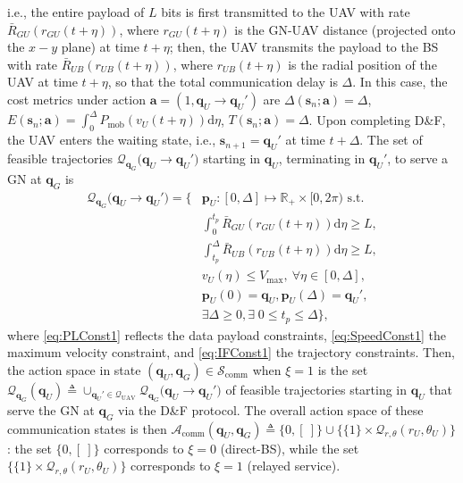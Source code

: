 \documentclass[10pt, twocolumn]{IEEEtran}
\theoremstyle{plain}
\theoremstyle{definition}
\theoremstyle{remark}
\begin{document}
i.e., the entire payload of $L$ bits is first transmitted to the UAV with rate $\bar R_{GU}(r_{GU}(t{+}\eta))$, where $r_{GU}(t{+}{\eta})$ is the GN-UAV distance (projected onto the $x{-}y$ plane) at time $t{+}\eta$; then, the UAV transmits the payload to the BS with rate $\bar{R}_{UB}(r_{UB}(t{+}\eta))$, where $r_{UB}(t{+}\eta)$ is the radial position of the UAV at time $t{+}\eta$, so that the total communication delay is $\Delta$.  In this case, the cost metrics under action $\mathbf{{a}}=(1,\mathbf{q}_{U}{\rightarrow}{\mathbf{q}}_{U}')$ are $\Delta(\mathbf{s}_{n};\mathbf{{a}}){=}\Delta$, $E(\mathbf{s}_{n};\mathbf{{a}}){=}\int_0^\Delta P_{\mathrm{mob}}\left(v_{U}(t{+}\eta)\right)\mathrm{d}\eta$, $T(\mathbf{s}_{n};\mathbf{{a}}){=}\Delta$. Upon completing D\&F, the UAV enters the {waiting} state, i.e., $\mathbf{s}_{n{+}1}{=}\mathbf{q}_{U}'$ at time $t{+}\Delta$. The set of feasible trajectories $\mathcal{Q}_{\mathbf q_G} \big({\mathbf q}_U\rightarrow{\mathbf q}_U'\big)$ starting in $\mathbf{q}_{U}$, terminating in $\mathbf{q}_{U}'$, to serve a GN at $\mathbf{q}_{G}$ is
\begin{align}
	\mathcal{Q}_{\mathbf q_G} \big({\mathbf q}_U\rightarrow{\mathbf q}_U'\big) = \Big\{ &\mathbf{p}_{U} : 
	[0,\Delta] \mapsto \mathbb{R}_{+} \times[0,2\pi)\text{ s.t.}\nonumber\\
	&\int_{0}^{t_{p}} \bar{R}_{GU}(r_{GU}(t+\eta)) \mathrm d \eta \geq L,\nonumber\\ &\int_{t_p}^{\Delta} \bar R_{UB}(r_{UB}(t+\eta)) \mathrm d \eta \geq L, \label{eq:PLConst1}\tag{C.1}\\
	&v_U (\eta) \leq V_{\mathrm{max}},\ \forall\eta\in[0,\Delta],\label{eq:SpeedConst1}\tag{C.2}\\
	&\mathbf{p}_{U}(0) ={\mathbf q}_U, 
	\mathbf{p}_{U}(\Delta) ={\mathbf q}_U',\label{eq:IFConst1}\tag{C.3}\\
	&\exists \Delta \geq 0, \exists\; 0 \leq t_p \leq \Delta 
	\Big\}\nonumber,
\end{align}
where \ref{eq:PLConst1} reflects the data payload constraints, \ref{eq:SpeedConst1} the maximum velocity constraint, and \ref{eq:IFConst1} the trajectory constraints. Then, the action space in state $(\mathbf{q}_{U},\mathbf{q}_{G}){\in}\mathcal{S}_{\mathrm{comm}}$ when $\xi{=}1$ is the set $\mathcal{Q}_{\mathbf{q}_{G}}(\mathbf{q}_{U}){\triangleq}\cup_{\mathbf{q}_{U}'{\in}\mathcal{Q}_{\mathrm{UAV}}}\mathcal{Q}_{\mathbf{q}_{G}}\big(\mathbf{q}_{U}{\rightarrow}\mathbf{q}_{U}'\big)$ of feasible trajectories starting in $\mathbf{q}_{U}$ that serve the GN at $\mathbf{q}_{G}$ via the D\&F protocol. The overall action space of these {communication} states is then $\mathcal{A}_{\mathrm{comm}}(\mathbf{q}_{U},\mathbf{q}_{G}){\triangleq}\{0,[\ ]\}{\cup}\{\{1\}{\times}\mathcal{Q}_{r,\theta}(r_{U},\theta_{U})\}$: the set $\{0, [\ ]\}$ corresponds to $\xi{=}0$ (direct-BS), while the set $\{\{1\}{\times}\mathcal{Q}_{r,\theta}(r_{U},\theta_{U})\}$ corresponds to $\xi{=}1$ (relayed service).\\
\end{document}
